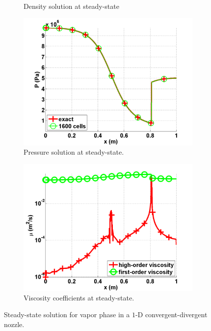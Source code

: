 \begin{figure}[H]
\begin{subfigure}[b]{0.495\textwidth}
                \caption{Density solution at steady-state}
                \label{fig:1d_nozzle_vap_density}
        \end{subfigure}
        \begin{subfigure}[b]{0.495\textwidth}
                \centering
                \includegraphics[scale=.50]{figures/vapor_pressure_numerical_and_exact_1600.png}
                \caption{Pressure solution at steady-state.}
                \label{fig:1d_nozzle_vap_press}
        \end{subfigure}
        \begin{subfigure}[b]{0.495\textwidth}
                \centering
                \includegraphics[scale=.50]{figures/vapor_viscosity_numerical1600.png}
                \caption{Viscosity coefficients at steady-state.}
                \label{fig:1d_nozzle_vap_visc}
        \end{subfigure}
        \caption{Steady-state solution for vapor phase in a $1$-D convergent-divergent nozzle.}\label{fig:1d_vap_nozzle}
\end{figure}
